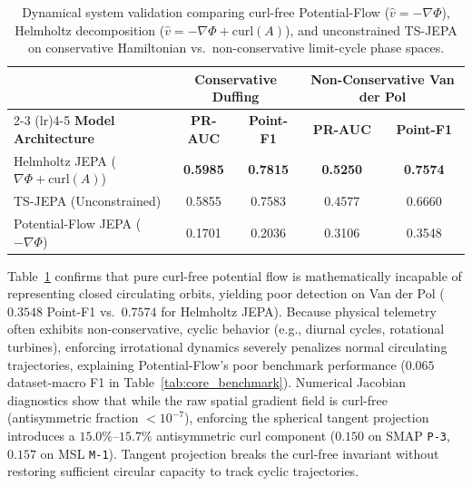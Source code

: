\begin{table}[t]
\centering
\small
\caption{Dynamical system validation comparing curl-free Potential-Flow ($\hat{v} = -\nabla\Phi$), Helmholtz decomposition ($\hat{v} = -\nabla\Phi + \text{curl}(A)$), and unconstrained TS-JEPA on conservative Hamiltonian vs.\ non-conservative limit-cycle phase spaces.}
\label{tab:potential_flow_validation}
\scriptsize
\setlength{\tabcolsep}{2.5pt}
\begin{tabular}{@{}lcccc@{}}
\toprule
& \multicolumn{2}{c}{\textbf{Conservative Duffing}} & \multicolumn{2}{c}{\textbf{Non-Conservative Van der Pol}} \\
\cmidrule(lr){2-3} \cmidrule(lr){4-5}
\textbf{Model Architecture} & \textbf{PR-AUC} & \textbf{Point-F1} & \textbf{PR-AUC} & \textbf{Point-F1} \\
\midrule
Helmholtz JEPA ($\nabla\Phi + \text{curl}(A)$) & \textbf{0.5985} & \textbf{0.7815} & \textbf{0.5250} & \textbf{0.7574} \\
TS-JEPA (Unconstrained) & 0.5855 & 0.7583 & 0.4577 & 0.6660 \\
Potential-Flow JEPA ($-\nabla\Phi$) & 0.1701 & 0.2036 & 0.3106 & 0.3548 \\
\bottomrule
\end{tabular}
\end{table}

Table~\ref{tab:potential_flow_validation} confirms that pure curl-free potential flow is mathematically incapable of representing closed circulating orbits, yielding poor detection on Van der Pol ($0.3548$ Point-F1 vs.\ $0.7574$ for Helmholtz JEPA). Because physical telemetry often exhibits non-conservative, cyclic behavior (e.g., diurnal cycles, rotational turbines), enforcing irrotational dynamics severely penalizes normal circulating trajectories, explaining Potential-Flow's poor benchmark performance ($0.065$ dataset-macro F1 in Table~\ref{tab:core_benchmark}). Numerical Jacobian diagnostics show that while the raw spatial gradient field is curl-free (antisymmetric fraction $< 10^{-7}$), enforcing the spherical tangent projection introduces a $15.0\%\text{--}15.7\%$ antisymmetric curl component ($0.150$ on SMAP \texttt{P-3}, $0.157$ on MSL \texttt{M-1}). Tangent projection breaks the curl-free invariant without restoring sufficient circular capacity to track cyclic trajectories.


